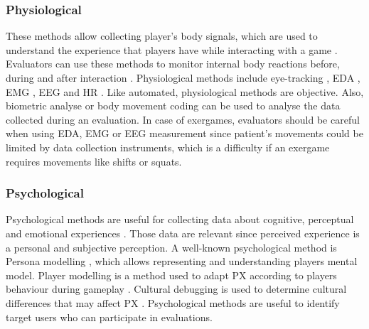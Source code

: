 \subsubsection{Physiological}
These methods allow collecting player’s body signals, which are used to understand the experience that players have while interacting with a game \autocite{Wiemeyer2016,Nacke2015}. Evaluators can use these methods to monitor internal body reactions before, during and after interaction \autocite{Mueller2011}. Physiological methods include eye-tracking \autocite{Wiemeyer2016,Nackea}, \ac{EDA} \autocite{Wiemeyer2016,Nacke2015}, \ac{EMG} \autocite{Wiemeyer2016,Nacke2015}, \ac{EEG} \autocite{Wiemeyer2016,Nacke2015} and \ac{HR} \autocite{Wiemeyer2016,Nacke2015}. Like automated, physiological methods are objective. Also, biometric analyse \autocite{Nacke2009} or body movement coding \autocite{Mueller2015,Nijhar2012} can be used to analyse the data collected during an evaluation. In case of exergames, evaluators should be careful when using \ac{EDA}, \ac{EMG} or \ac{EEG} measurement since patient’s movements could be limited by data collection instruments, which is a difficulty if an exergame requires movements like shifts or squats.

\subsubsection{Psychological}
Psychological methods are useful for collecting data about cognitive, perceptual and emotional experiences \autocite{Wiemeyer2016,Nackea}. Those data are relevant since perceived experience is a personal and subjective perception. A well-known psychological method is Persona modelling \autocite{Wiemeyer2016,Nackea}, which allows representing and understanding players mental model. Player modelling is a method used to adapt PX according to players behaviour during gameplay \autocite{Wiemeyer2016,Nackea}. Cultural debugging is used to determine cultural differences that may affect PX \autocite{Nackea}. Psychological methods are useful to identify target users who can participate in evaluations.



